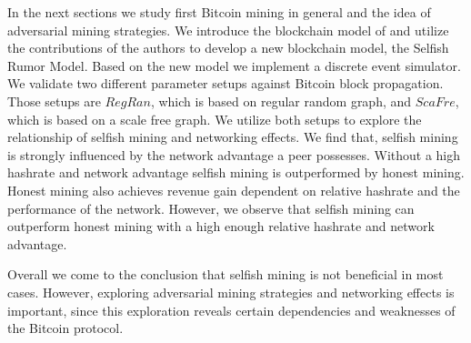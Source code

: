 In the next sections we study first Bitcoin mining in general and the idea of adversarial mining strategies. We introduce the blockchain model of  and utilize the contributions of the authors to develop a new blockchain model, the Selfish Rumor Model.
Based on the new model we implement a discrete event simulator. We validate two different parameter setups against Bitcoin block propagation. Those setups are $RegRan$, which is based on regular random graph, and $ScaFre$, which is based on a scale free graph. We utilize both setups to explore the relationship of selfish mining and networking effects. We find that, selfish mining is strongly influenced by the network advantage a peer possesses. Without a high hashrate and network advantage selfish mining is outperformed by honest mining. Honest mining also achieves revenue gain dependent on relative hashrate and the performance of the network. However, we observe that selfish mining can outperform honest mining with a high enough relative hashrate and network advantage.

Overall we come to the conclusion that selfish mining is not beneficial in most cases. However, exploring adversarial mining strategies and networking effects is important, since this exploration reveals certain dependencies and weaknesses of the Bitcoin protocol.





